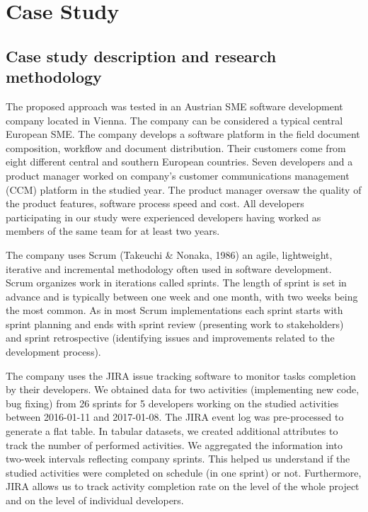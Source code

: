 \section{Case Study}

\subsection{Case study description and research methodology}
The proposed approach was tested in an Austrian SME software development company located in Vienna. The company can be considered a typical central European SME. The company develops a software platform in the field document composition, workflow and document distribution. Their customers come from eight different central and southern European countries. Seven developers and a product manager worked on company’s customer communications management (CCM) platform in the studied year. The product manager oversaw the quality of the product features, software process speed and cost. All developers participating in our study were experienced developers having worked as members of the same team for at least two years.

The company uses Scrum (Takeuchi \& Nonaka, 1986) an agile, lightweight, iterative and incremental methodology often used in software development. Scrum organizes work in iterations called sprints. The length of sprint is set in advance and is typically between one week and one month, with two weeks being the most common. As in most Scrum implementations each sprint starts with sprint planning and ends with sprint review (presenting work to stakeholders) and sprint retrospective (identifying issues and improvements related to the development process). 

The company uses the JIRA issue tracking software to monitor tasks completion by their developers. We obtained data for two activities (implementing new code, bug fixing) from 26 sprints for 5 developers working on the studied activities between 2016-01-11 and 2017-01-08. The JIRA event log was pre-processed to generate a flat table. In tabular datasets, we created additional attributes to track the number of performed activities. We aggregated the information into two-week intervals reflecting company sprints. This helped us understand if the studied activities were completed on schedule (in one sprint) or not. Furthermore, JIRA allows us to track activity completion rate on the level of the whole project and on the level of individual developers. 

